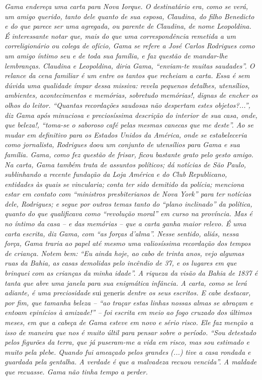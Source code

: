 {\begin{didascalia}
\emph{Gama endereça uma carta para Nova Iorque. O destinatário era, como
se verá, um amigo querido, tanto dele quanto de sua esposa, Claudina, do
filho Benedicto e do que parece ser uma agregada, ou parente de
Claudina, de nome Leopoldina. É interessante notar que, mais do que uma
correspondência remetida a um correligionário ou colega de ofício, Gama
se refere a José Carlos Rodrigues como um amigo íntimo seu e de toda sua
família, e faz questão de mandar-lhe lembranças. Claudina e Leopoldina,
diria Gama, ``enviam-te muitas saudades''. O relance da cena familiar é um
entre os tantos que recheiam a carta. Essa é sem dúvida uma qualidade
ímpar dessa missiva: revela pequenos detalhes, utensílios, ambientes,
acontecimentos e memórias, sobretudo memórias!, dignas de encher os
olhos do leitor. ``Quantas recordações saudosas não despertam estes
objetos?...'', diz Gama após minuciosa e preciosíssima descrição do
interior de sua casa, onde, que beleza!, ``toma-se o saboroso café pelas
mesmas canecas que me deste''. Ao se mudar em definitivo para os Estados
Unidos da América, onde se estabeleceria como jornalista, Rodrigues doou
um conjunto de utensílios para Gama e sua família. Gama, como fez
questão de frisar, ficou bastante grato pelo gesto amigo. Na carta, Gama
também trata de assuntos políticos; dá notícias de São Paulo,
sublinhando a recente fundação da Loja América e do Club Republicano,
entidades às quais se vincularia; conta ter sido demitido da polícia;
menciona estar em contato com ``ministros presbiterianos de Nova York''
para ter notícias dele, Rodrigues; e segue por outros temas tanto do
``plano inclinado'' da política, quanto do que qualificava como ``revolução
moral'' em curso na província. Mas é no íntimo da casa -- e das memórias
-- que a carta ganha maior relevo. É uma carta escrita, diz Gama, com
``as forças d'alma''. Nesse sentido, aliás, nessa força, Gama traria ao
papel até mesmo uma valiosíssima recordação dos tempos de criança. Notem
bem: ``Eu ainda hoje, ao cabo de trinta anos, vejo algumas ruas da Bahia,
as casas demolidas pelo incêndio de 37, e os lugares em que brinquei com
as crianças da minha idade''. A riqueza da visão da Bahia de 1837 é tanta
que abre uma janela para sua enigmática infância. A carta, como se lerá
adiante, é uma preciosidade} sui generis \emph{dentre os seus escritos.
E cabe destacar, por fim, que tamanha beleza -- ``ao traçar estas linhas
nossas almas se abraçam e entoam epinícios à amizade!'' -- foi escrita em
meio ao fogo cruzado dos últimos meses, em que a cabeça de Gama esteve
em novo e sério risco. Ele faz menção a isso de maneira que nos é muito
últil para pensar sobre o período. ``Sou detestado pelos figurões da
terra, que já puseram-me a vida em risco, mas sou estimado e muito pela
plebe. Quando fui ameaçado pelos grandes (...) tive a casa rondada e
guardada pela gentalha. A verdade é que a malvadeza recuou vencida''. A
maldade que recuasse. Gama não tinha tempo a perder.}
\end{didascalia}

}
